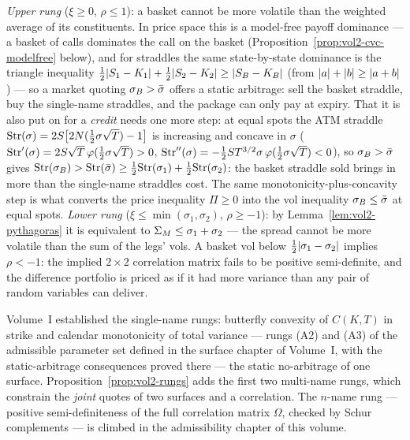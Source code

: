 \begin{remark}
\label{rem:vol2-rungs-desk}
\emph{Upper rung} ($\xi \ge 0$, $\rho \le 1$): a basket cannot be more
volatile than the weighted average of its constituents. In price space this
is a model-free payoff dominance --- a basket of calls dominates the call on
the basket (Proposition~\ref{prop:vol2-cvc-modelfree} below), and for
straddles the same state-by-state dominance is the triangle inequality
$\tfrac12\lvert S_1 - K_1\rvert + \tfrac12\lvert S_2 - K_2\rvert \ge \lvert S_B - K_B\rvert$
(from $\lvert a\rvert + \lvert b\rvert \ge \lvert a+b\rvert$) --- so a market quoting
$\sigma_B > \bar\sigma$ offers a static arbitrage: sell the basket straddle, buy
the single-name straddles, and the package can only pay at expiry.
That it is also put on for a \emph{credit} needs one more step: at equal
spots the ATM straddle
$\mathrm{Str}(\sigma) = 2S\bigl[2N(\tfrac12\sigma\sqrt{T}) - 1\bigr]$
is increasing and concave in $\sigma$
($\mathrm{Str}'(\sigma) = 2S\sqrt{T}\,\varphi(\tfrac12\sigma\sqrt{T}) > 0$,
$\mathrm{Str}''(\sigma) = -\tfrac12 S T^{3/2}\sigma\,
\varphi(\tfrac12\sigma\sqrt{T}) < 0$), so $\sigma_B > \bar\sigma$ gives
$\mathrm{Str}(\sigma_B) > \mathrm{Str}(\bar\sigma) \ge
\tfrac12\mathrm{Str}(\sigma_1) + \tfrac12\mathrm{Str}(\sigma_2)$: the basket
straddle sold brings in more than the single-name straddles cost. The same
monotonicity-plus-concavity step is what converts the price inequality
$\Pi \ge 0$ into the vol inequality $\sigma_B \le \bar\sigma$ at equal spots.
\emph{Lower rung} ($\xi \le \min(\sigma_1,\sigma_2)$, $\rho \ge -1$): by
Lemma~\ref{lem:vol2-pythagoras} it is equivalent to
$\Sigma_M \le \sigma_1 + \sigma_2$ --- the spread cannot be more volatile than
the sum of the legs' vols. A basket vol below $\tfrac12\lvert\sigma_1-\sigma_2\rvert$
implies $\rho < -1$: the implied $2\times2$ correlation matrix fails to be
positive semi-definite, and the difference portfolio is priced as if it had
more variance than any pair of random variables can deliver.
\end{remark}

\begin{remark}
\label{rem:vol2-ladder-continued}
Volume~I established the single-name rungs: butterfly convexity of
$C(K,T)$ in strike and calendar monotonicity of total variance --- rungs
(A2) and (A3) of the admissible parameter set defined in the surface
chapter of Volume~I, with the static-arbitrage consequences proved
there --- the static
no-arbitrage of one surface. Proposition~\ref{prop:vol2-rungs} adds the first
two multi-name rungs, which constrain the \emph{joint} quotes of two surfaces
and a correlation. The $n$-name rung --- positive semi-definiteness of the
full correlation matrix $\Omega$, checked by Schur complements --- is climbed
in the admissibility chapter of this volume.
\end{remark}

